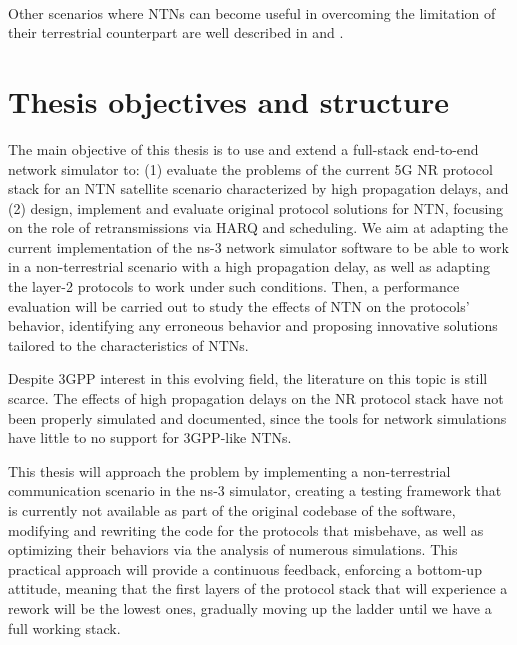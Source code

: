 \paragraph{} Other scenarios where \ac{NTNs} can become useful in overcoming the limitation of their terrestrial counterpart are well described in \cite{ntn-6g-era-challenges-giordani} and \cite{potential-multilayered-nierarchical-ntn-wang}.


\section{Thesis objectives and structure}

The main objective of this thesis is to use and extend a full-stack end-to-end network simulator to: (1) evaluate the problems of the current 5G \ac{NR} protocol stack for an \ac{NTN} satellite scenario characterized by high propagation delays, and (2) design, implement and evaluate original protocol solutions for \ac{NTN}, focusing on the role of retransmissions via \ac{HARQ} and scheduling. We aim at adapting the current implementation of the ns-3 network simulator software to be able to work in a non-terrestrial scenario with a high propagation delay, as well as adapting the layer-2 protocols to work under such conditions. Then, a performance evaluation will be carried out to study the effects of \ac{NTN} on the protocols' behavior, identifying any erroneous behavior and proposing innovative solutions tailored to the characteristics of \ac{NTN}s.

Despite \ac{3GPP} interest in this evolving field, the literature on this topic is still scarce. The effects of high propagation delays on the \ac{NR} protocol stack have not been properly simulated and documented, since the tools for network simulations have little to no support for \ac{3GPP}-like \ac{NTN}s. 

This thesis will approach the problem by implementing a non-terrestrial communication scenario in the ns-3 simulator, creating a testing framework that is currently not available as part of the original codebase of the software, modifying and rewriting the code for the protocols that misbehave, as well as optimizing their behaviors via the analysis of numerous simulations. This practical approach will provide a continuous feedback, enforcing a bottom-up attitude, meaning that the first layers of the protocol stack that will experience a rework will be the lowest ones, gradually moving up the ladder until we have a full working stack.

